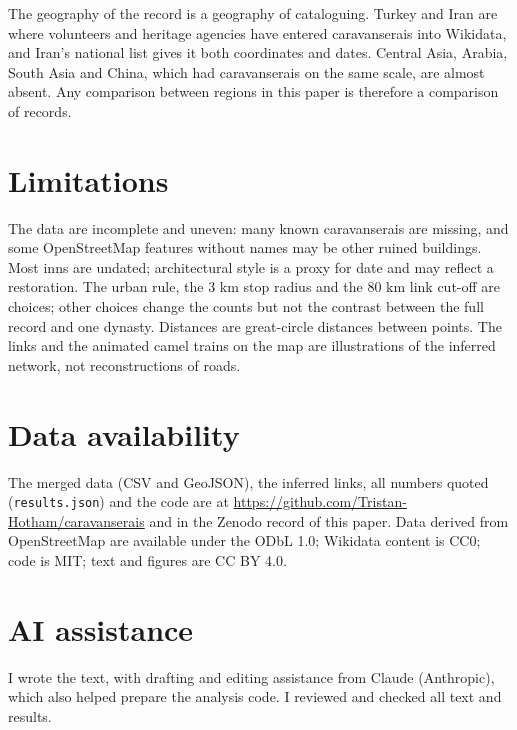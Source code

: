 \documentclass[11pt,a4paper]{article}
\begin{document}
The geography of the record is a geography of cataloguing. Turkey and Iran are where volunteers and heritage agencies have entered caravanserais into Wikidata, and Iran's national list gives it both coordinates and dates. Central Asia, Arabia, South Asia and China, which had caravanserais on the same scale, are almost absent. Any comparison between regions in this paper is therefore a comparison of records.

\section{Limitations}
The data are incomplete and uneven: many known caravanserais are missing, and some OpenStreetMap features without names may be other ruined buildings. Most inns are undated; architectural style is a proxy for date and may reflect a restoration. The urban rule, the 3 km stop radius and the 80 km link cut-off are choices; other choices change the counts but not the contrast between the full record and one dynasty. Distances are great-circle distances between points. The links and the animated camel trains on the map are illustrations of the inferred network, not reconstructions of roads.

\section*{Data availability}
The merged data (CSV and GeoJSON), the inferred links, all numbers quoted (\texttt{results.json}) and the code are at \url{https://github.com/Tristan-Hotham/caravanserais} and in the Zenodo record of this paper. Data derived from OpenStreetMap are available under the ODbL 1.0; Wikidata content is CC0; code is MIT; text and figures are CC BY 4.0.

\section*{AI assistance}
I wrote the text, with drafting and editing assistance from Claude (Anthropic), which also helped prepare the analysis code. I reviewed and checked all text and results.
\end{document}
